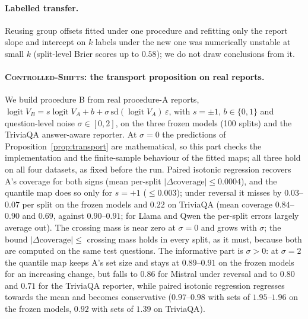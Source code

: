 \documentclass[twoside]{article}
\theoremstyle{definition}
\theoremstyle{remark}
\newcommand{\1}{\mathbf{1}}
\newcommand{\expname}[1]{\textsc{#1}}
\begin{document}
\paragraph{Labelled transfer.} Reusing group offsets fitted under one procedure and refitting only the
report slope and intercept on $k$ labels under the new one was numerically unstable at small $k$
(split-level Brier scores up to $0.58$); we do not draw conclusions from it.

\paragraph{\expname{Controlled-Shifts}: the transport proposition on real reports.} We build
procedure B from real procedure-A reports, $\operatorname{logit}V_B=s\operatorname{logit}V_A+b+\sigma\,
\mathrm{sd}(\operatorname{logit}V_A)\,\varepsilon$, with $s=\pm1$, $b\in\{0,1\}$ and question-level noise
$\sigma\in[0,2]$, on the three frozen models (100 splits) and the TriviaQA answer-aware reporter. At
$\sigma=0$ the predictions of Proposition~\ref{prop:transport} are mathematical, so this part checks the
implementation and the finite-sample behaviour of the fitted maps; all three hold on all four datasets,
as fixed before the run. Paired isotonic regression recovers A's coverage for both signs (mean per-split
$|\Delta\text{coverage}|\le0.0004$), and the quantile map does so only for $s=+1$ ($\le0.003$); under
reversal it misses by $0.03$--$0.07$ per split on the frozen models and $0.22$ on TriviaQA (mean coverage
$0.84$--$0.90$ and $0.69$, against $0.90$--$0.91$; for Llama and Qwen the per-split errors largely average
out). The crossing mass is near zero at $\sigma=0$ and grows with $\sigma$; the bound
$|\Delta\text{coverage}|\le$ crossing mass holds in every split, as it must, because both are computed on
the same test questions. The informative part is $\sigma>0$: at $\sigma=2$ the quantile map keeps A's set
size and stays at $0.89$--$0.91$ on the frozen models for an increasing change, but falls to $0.86$ for
Mistral under reversal and to $0.80$ and $0.71$ for the TriviaQA reporter, while paired isotonic regression
regresses towards the mean and becomes conservative ($0.97$--$0.98$ with sets of $1.95$--$1.96$ on the frozen
models, $0.92$ with sets of $1.39$ on TriviaQA).
\end{document}
